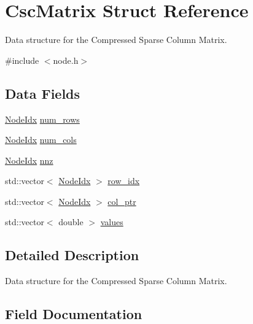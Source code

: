 \hypertarget{structCscMatrix}{}\section{Csc\+Matrix Struct Reference}
\label{structCscMatrix}


Data structure for the Compressed Sparse Column Matrix.  




{\ttfamily \#include $<$node.\+h$>$}

\subsection*{Data Fields}
\begin{DoxyCompactItemize}
\item 
\hyperlink{node_8h_a5b622fe4354316a2f349615d150ae998}{Node\+Idx} \hyperlink{structCscMatrix_a9e6fea3106af21e3c05e1c497e0ee69f}{num\+\_\+rows}
\item 
\hyperlink{node_8h_a5b622fe4354316a2f349615d150ae998}{Node\+Idx} \hyperlink{structCscMatrix_add293b1d06d14359190fc4cb3fd35714}{num\+\_\+cols}
\item 
\hyperlink{node_8h_a5b622fe4354316a2f349615d150ae998}{Node\+Idx} \hyperlink{structCscMatrix_ae5f18924a98bd8115bd34bb5a61bf1c1}{nnz}
\item 
std\+::vector$<$ \hyperlink{node_8h_a5b622fe4354316a2f349615d150ae998}{Node\+Idx} $>$ \hyperlink{structCscMatrix_a2eef34de7f3687351e18cb8e1da74329}{row\+\_\+idx}
\item 
std\+::vector$<$ \hyperlink{node_8h_a5b622fe4354316a2f349615d150ae998}{Node\+Idx} $>$ \hyperlink{structCscMatrix_a6bd9ad7395e2e10ee4bb0cf9c1e1ddc9}{col\+\_\+ptr}
\item 
std\+::vector$<$ double $>$ \hyperlink{structCscMatrix_ae540c6a54027394970614fe75f20d68a}{values}
\end{DoxyCompactItemize}


\subsection{Detailed Description}
Data structure for the Compressed Sparse Column Matrix. 

\subsection{Field Documentation}
\mbox{\label{structCscMatrix_a6bd9ad7395e2e10ee4bb0cf9c1e1ddc9}} 

